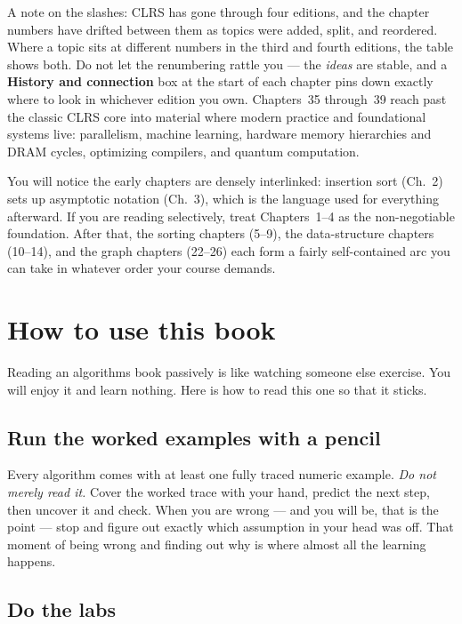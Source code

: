 A note on the slashes: CLRS has gone through four editions, and the chapter
numbers have drifted between them as topics were added, split, and reordered. Where
a topic sits at different numbers in the third and fourth editions, the table shows
both. Do not let the renumbering rattle you --- the \emph{ideas} are stable, and a
\textbf{History and connection} box at the start of each chapter pins down exactly
where to look in whichever edition you own. Chapters~35 through~39 reach past
the classic CLRS core into material where modern practice and foundational systems live:
parallelism, machine learning, hardware memory hierarchies and DRAM cycles, optimizing
compilers, and quantum computation.

\begin{marginnotebox}
You will notice the early chapters are densely interlinked: insertion sort
(Ch.~2) sets up asymptotic notation (Ch.~3), which is the language used for
everything afterward. If you are reading selectively, treat Chapters~1--4 as the
non-negotiable foundation. After that, the sorting chapters (5--9), the
data-structure chapters (10--14), and the graph chapters (22--26) each form a
fairly self-contained arc you can take in whatever order your course demands.
\end{marginnotebox}

\section*{How to use this book}

Reading an algorithms book passively is like watching someone else exercise. You
will enjoy it and learn nothing. Here is how to read this one so that it sticks.

\subsection*{Run the worked examples with a pencil}

Every algorithm comes with at least one fully traced numeric example. \emph{Do
not merely read it.} Cover the worked trace with your hand, predict the next step,
then uncover it and check. When you are wrong --- and you will be, that is the
point --- stop and figure out exactly which assumption in your head was off. That
moment of being wrong and finding out why is where almost all the learning
happens.

\subsection*{Do the labs}

